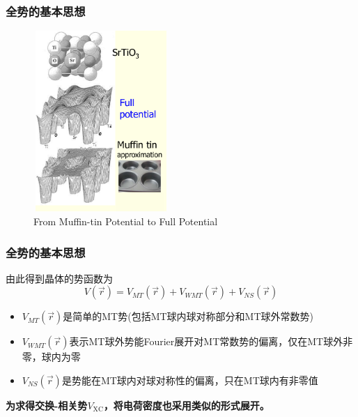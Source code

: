 \frame
{
\frametitle{全势的基本思想}
\vspace*{-13pt}
\begin{figure}[h!]
\centering
\includegraphics[height=2.70in,width=2.02in,viewport=1 22 507 715,clip]{Figures/MT_FP.png}
\caption{\tiny \textrm{From Muffin-tin Potential to Full Potential}}%
\label{Muffin_tin_FP}
\end{figure}
}

\frame
{
\frametitle{全势的基本思想}
由此得到晶体的势函数为
$$ V(\vec r)=V_{MT}(\vec r)+V_{WMT}(\vec r)+V_{NS}(\vec r)
  \label{eq:solid-64}
$$
\begin{itemize}
	\item $V_{MT}(\vec r)$是简单的\textrm{MT}势(包括\textrm{MT}球内球对称部分和\textrm{MT}球外常数势)
	\item $V_{WMT}(\vec r)$表示\textrm{MT}球外势能\textrm{Fourier}展开对\textrm{MT}常数势的偏离，仅在\textrm{MT}球外非零，球内为零
	\item $V_{NS}(\vec r)$是势能在\textrm{MT}球内对球对称性的偏离，只在\textrm{MT}球内有非零值
\end{itemize}
\textbf{\large 为求得交换-相关势$V_{\mathrm{XC}}$，将电荷密度也采用类似的形式展开。}
}

